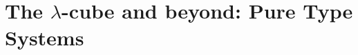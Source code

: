 \documentclass[reqno]{amsart}
\begin{document}
    \begin{lemma}
        
    \end{lemma}

    \begin{theorem}

    \end{theorem}

    \section{The $\lambda$-cube and beyond: Pure Type Systems}

    \begin{definition}
        
    \end{definition}

    \begin{lemma}
        
    \end{lemma}

    \begin{theorem}
        
    \end{theorem}
\end{document}
